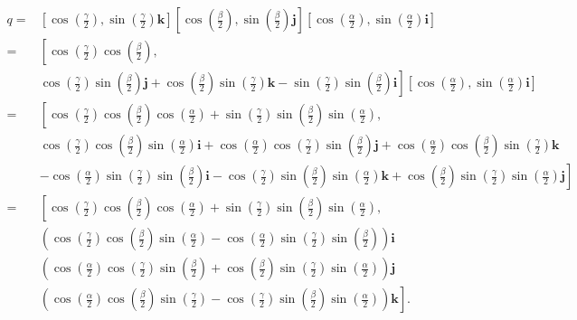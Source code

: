\documentclass[10pt]{article}
\begin{document}
$$
\begin{aligned}
q= & {\left[\cos \left(\frac{\gamma}{2}\right), \sin \left(\frac{\gamma}{2}\right) \mathbf{k}\right]\left[\cos \left(\frac{\beta}{2}\right), \sin \left(\frac{\beta}{2}\right) \mathbf{j}\right]\left[\cos \left(\frac{\alpha}{2}\right), \sin \left(\frac{\alpha}{2}\right) \mathbf{i}\right] } \\
= & {\left[\cos \left(\frac{\gamma}{2}\right) \cos \left(\frac{\beta}{2}\right),\right.} \\
& \left.\cos \left(\frac{\gamma}{2}\right) \sin \left(\frac{\beta}{2}\right) \mathbf{j}+\cos \left(\frac{\beta}{2}\right) \sin \left(\frac{\gamma}{2}\right) \mathbf{k}-\sin \left(\frac{\gamma}{2}\right) \sin \left(\frac{\beta}{2}\right) \mathbf{i}\right]\left[\cos \left(\frac{\alpha}{2}\right), \sin \left(\frac{\alpha}{2}\right) \mathbf{i}\right] \\
= & {\left[\cos \left(\frac{\gamma}{2}\right) \cos \left(\frac{\beta}{2}\right) \cos \left(\frac{\alpha}{2}\right)+\sin \left(\frac{\gamma}{2}\right) \sin \left(\frac{\beta}{2}\right) \sin \left(\frac{\alpha}{2}\right),\right.} \\
& \cos \left(\frac{\gamma}{2}\right) \cos \left(\frac{\beta}{2}\right) \sin \left(\frac{\alpha}{2}\right) \mathbf{i}+\cos \left(\frac{\alpha}{2}\right) \cos \left(\frac{\gamma}{2}\right) \sin \left(\frac{\beta}{2}\right) \mathbf{j}+\cos \left(\frac{\alpha}{2}\right) \cos \left(\frac{\beta}{2}\right) \sin \left(\frac{\gamma}{2}\right) \mathbf{k} \\
& \left.-\cos \left(\frac{\alpha}{2}\right) \sin \left(\frac{\gamma}{2}\right) \sin \left(\frac{\beta}{2}\right) \mathbf{i}-\cos \left(\frac{\gamma}{2}\right) \sin \left(\frac{\beta}{2}\right) \sin \left(\frac{\alpha}{2}\right) \mathbf{k}+\cos \left(\frac{\beta}{2}\right) \sin \left(\frac{\gamma}{2}\right) \sin \left(\frac{\alpha}{2}\right) \mathbf{j}\right] \\
= & {\left[\cos \left(\frac{\gamma}{2}\right) \cos \left(\frac{\beta}{2}\right) \cos \left(\frac{\alpha}{2}\right)+\sin \left(\frac{\gamma}{2}\right) \sin \left(\frac{\beta}{2}\right) \sin \left(\frac{\alpha}{2}\right),\right.} \\
& \left(\cos \left(\frac{\gamma}{2}\right) \cos \left(\frac{\beta}{2}\right) \sin \left(\frac{\alpha}{2}\right)-\cos \left(\frac{\alpha}{2}\right) \sin \left(\frac{\gamma}{2}\right) \sin \left(\frac{\beta}{2}\right)\right) \mathbf{i} \\
& \left(\cos \left(\frac{\alpha}{2}\right) \cos \left(\frac{\gamma}{2}\right) \sin \left(\frac{\beta}{2}\right)+\cos \left(\frac{\beta}{2}\right) \sin \left(\frac{\gamma}{2}\right) \sin \left(\frac{\alpha}{2}\right)\right) \mathbf{j} \\
& \left.\left(\cos \left(\frac{\alpha}{2}\right) \cos \left(\frac{\beta}{2}\right) \sin \left(\frac{\gamma}{2}\right)-\cos \left(\frac{\gamma}{2}\right) \sin \left(\frac{\beta}{2}\right) \sin \left(\frac{\alpha}{2}\right)\right) \mathbf{k}\right] .
\end{aligned}
$$
\end{document}
